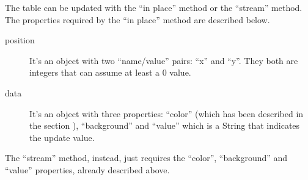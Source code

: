 		The table can be updated with the “in place” method or the “stream” method.
		The properties required by the “in place” method are described below.
		\begin{description}
			\item[position] It's an object with two “name/value” pairs: “x” and “y”. They both are integers that can assume at least a 0 value.
			\item[data] It's an object with three properties: “color” (which has been described in the section ), “background” and “value” which is a String that indicates the update value.
		\end{description}
		The “stream” method, instead, just requires the “color”, “background” and “value” properties, already described above.